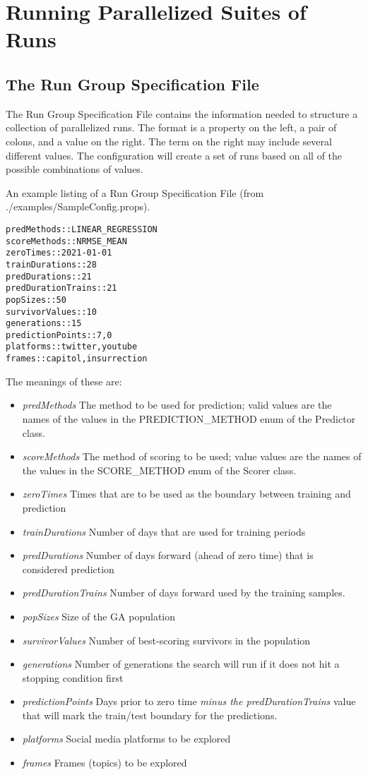 \section{Running Parallelized Suites of Runs}

\subsection{The Run Group Specification File}

The Run Group Specification File contains the information needed to structure a collection of parallelized runs. The format is a property on the left, a pair of colons, and a value on the right. The term on the right may include several different values. The configuration will create a set of runs based on all of the possible combinations of values.

An example listing of a Run Group Specification File (from ./examples/SampleConfig.props).
\begin{lstlisting}
predMethods::LINEAR_REGRESSION
scoreMethods::NRMSE_MEAN
zeroTimes::2021-01-01
trainDurations::28
predDurations::21
predDurationTrains::21
popSizes::50
survivorValues::10
generations::15
predictionPoints::7,0
platforms::twitter,youtube
frames::capitol,insurrection
\end{lstlisting}

The meanings of these are:

\begin{itemize}
\item \textit{predMethods} The method to be used for prediction; valid values are the names of the values in the PREDICTION\_METHOD enum of the Predictor class.
\item \textit{scoreMethods} The method of scoring to be used; value values are the names of the values in the SCORE\_METHOD enum of the Scorer class.
\item \textit{zeroTimes} Times that are to be used as the boundary between training and prediction
\item \textit{trainDurations} Number of days that are used for training periods
\item \textit{predDurations} Number of days forward (ahead of zero time) that is considered prediction
\item \textit{predDurationTrains} Number of days forward used by the training samples. 
\item \textit{popSizes} Size of the GA population
\item \textit{survivorValues} Number of best-scoring survivors in the population
\item \textit{generations} Number of generations the search will run if it does not hit a stopping condition first
\item \textit{predictionPoints} Days prior to zero time \textit{minus the predDurationTrains} value that will mark the train/test boundary for the predictions.
\item \textit{platforms} Social media platforms to be explored
\item \textit{frames} Frames (topics) to be explored
\end{itemize}

